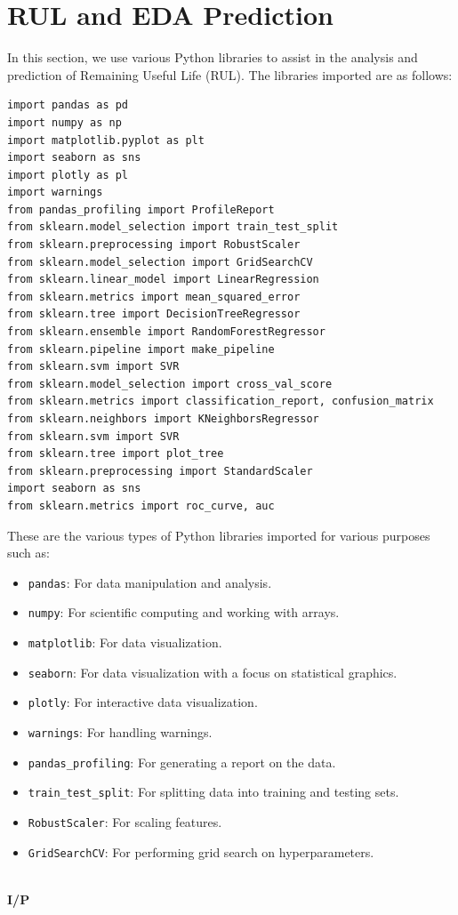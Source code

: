 \section{RUL and EDA Prediction}
In this section, we use various Python libraries to assist in the analysis and prediction of Remaining Useful Life (RUL). The libraries imported are as follows:
\begin{verbatim}
import pandas as pd 
import numpy as np 
import matplotlib.pyplot as plt 
import seaborn as sns 
import plotly as pl 
import warnings 
from pandas_profiling import ProfileReport 
from sklearn.model_selection import train_test_split 
from sklearn.preprocessing import RobustScaler 
from sklearn.model_selection import GridSearchCV 
from sklearn.linear_model import LinearRegression 
from sklearn.metrics import mean_squared_error 
from sklearn.tree import DecisionTreeRegressor 
from sklearn.ensemble import RandomForestRegressor 
from sklearn.pipeline import make_pipeline 
from sklearn.svm import SVR 
from sklearn.model_selection import cross_val_score 
from sklearn.metrics import classification_report, confusion_matrix 
from sklearn.neighbors import KNeighborsRegressor 
from sklearn.svm import SVR 
from sklearn.tree import plot_tree 
from sklearn.preprocessing import StandardScaler 
import seaborn as sns 
from sklearn.metrics import roc_curve, auc
\end{verbatim}
These are the various types of Python libraries imported for various purposes such as:
\begin{itemize}
    \item \texttt{pandas}: For data manipulation and analysis.
    \item \texttt{numpy}: For scientific computing and working with arrays.
    \item \texttt{matplotlib}: For data visualization.
    \item \texttt{seaborn}: For data visualization with a focus on statistical graphics.
    \item \texttt{plotly}: For interactive data visualization.
    \item \texttt{warnings}: For handling warnings.
    \item \texttt{pandas\_profiling}: For generating a report on the data.
    \item \texttt{train\_test\_split}: For splitting data into training and testing sets.
    \item \texttt{RobustScaler}: For scaling features.
    \item \texttt{GridSearchCV}: For performing grid search on hyperparameters.
\end{itemize}
\\
\noindent
\textbf{I/P} \\[-2.5em] %

